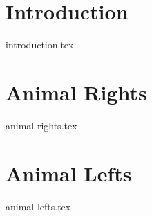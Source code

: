 \documentclass{article}
\begin{document}
\section{Introduction}
    {introduction.tex}
\section{Animal Rights}
    {animal-rights.tex}
\section{Animal Lefts}
    {animal-lefts.tex}
\end{document}
